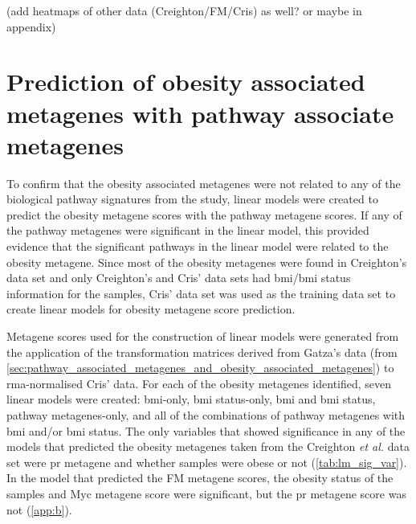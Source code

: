 (add heatmaps of other data (Creighton/FM/Cris) as well? or maybe in appendix)

\section{Prediction of obesity associated metagenes with pathway associate metagenes}
\label{sec:prediction_of_obesity_associated_metagene_with_pathway_associate_metagene}


To confirm that the obesity associated metagenes were not related to any of the biological pathway signatures from the \citet{Gatza2010a} study, linear models were created to predict the obesity metagene scores with the pathway metagene scores.
If any of the pathway metagenes were significant in the linear model, this provided evidence that the significant pathways in the linear model were related to the obesity metagene.
Since most of the obesity metagenes were found in Creighton's data set and only Creighton's and Cris' data sets had \gls{bmi}/\gls{bmi} status information for the samples, Cris' data set was used as the training data set to create linear models for obesity metagene score prediction.

Metagene scores used for the construction of linear models were generated from the application of the transformation matrices derived from Gatza's data (from \cref{sec:pathway_associated_metagenes_and_obesity_associated_metagenes}) to \gls{rma}-normalised Cris' data.
For each of the obesity metagenes identified, seven linear models were created: \gls{bmi}-only, \gls{bmi} status-only, \gls{bmi} and \gls{bmi} status, pathway metagenes-only, and all of the combinations of pathway metagenes with \gls{bmi} and/or \gls{bmi} status.
The only variables that showed significance in any of the models that predicted the obesity metagenes taken from the Creighton \textit{et al.} data set were \gls{pr} metagene and whether samples were obese or not (\cref{tab:lm_sig_var}).
In the model that predicted the FM metagene scores, the obesity status of the samples and Myc metagene score were significant, but the \gls{pr} metagene score was not (\cref{app:b}).

